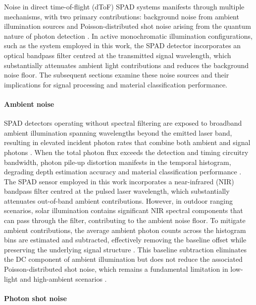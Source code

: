 \documentclass[12pt,a4paper,oneside]{report}
\begin{document}
Noise in direct time-of-flight (dToF) SPAD systems manifests through multiple mechanisms, with two primary contributions: background noise from ambient illumination sources and Poisson-distributed shot noise arising from the quantum nature of photon detection \cite{piron2020}. In active monochromatic illumination configurations, such as the system employed in this work, the SPAD detector incorporates an optical bandpass filter centred at the transmitted signal wavelength, which substantially attenuates ambient light contributions and reduces the background noise floor. The subsequent sections examine these noise sources and their implications for signal processing and material classification performance.

\paragraph{Ambient noise}
\label{par:ambient_noise}

SPAD detectors operating without spectral filtering are exposed to broadband ambient illumination spanning wavelengths beyond the emitted laser band, resulting in elevated incident photon rates that combine both ambient and signal photons \cite{piron2020}. When the total photon flux exceeds the detection and timing circuitry bandwidth, photon pile-up distortion manifests in the temporal histogram, degrading depth estimation accuracy and material classification performance \cite{tontini2024}. The SPAD sensor employed in this work incorporates a near-infrared (NIR) bandpass filter centred at the pulsed laser wavelength, which substantially attenuates out-of-band ambient contributions. However, in outdoor ranging scenarios, solar illumination contains significant NIR spectral components that can pass through the filter, contributing to the ambient noise floor. To mitigate ambient contributions, the average ambient photon counts across the histogram bins are estimated and subtracted, effectively removing the baseline offset while preserving the underlying signal structure \cite{tontini2024}. This baseline subtraction eliminates the DC component of ambient illumination but does not reduce the associated Poisson-distributed shot noise, which remains a fundamental limitation in low-light and high-ambient scenarios \cite{piron2020}.

\paragraph{Photon shot noise}
\label{par:shot_noise}
\end{document}
